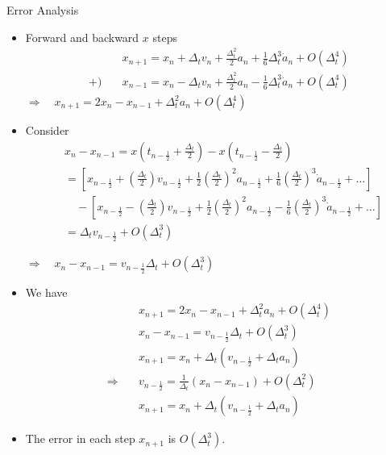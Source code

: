 \documentclass{beamer}
\newcommand{\beforeverb}{\footnotesize}
\newcommand{\afterverb}{\normalsize}
\begin{document}
\begin{frame}{Error Analysis}
  \begin{itemize}
    \item Forward and backward $x$ steps 
    \beforeverb
    \begin{align*} 
      & x_{n+1}=x_n+\Delta_t v_n+\frac{\Delta_t^2}{2} a_n+\frac{1}{6} 
      \Delta_t^3 \dot{a}_n+O\left(\Delta_t^4\right) \\ 
     +) \quad & x_{n-1}=x_n-\Delta_t v_n+\frac{\Delta_t^2}{2} a_n-\frac{1}{6} 
      \Delta_t^3 \dot{a}_n+O\left(\Delta_t^4\right)  
    \end{align*}
    \afterverb
    $\Rightarrow\quad   x_{n+1}=2 x_n-x_{n-1}+\Delta_t^2 a_n+O\left(\Delta_t^4\right)$
    \item Consider
    \beforeverb
    \begin{align*}
     & x_n-x_{n-1}=x\left(t_{n-\frac{1}{2}}+\frac{\Delta_t}{2}\right)-x\left(t_{n-\frac{1}{2}}-\frac{\Delta_t}{2}\right) \\
      &= \left[x_{n-\frac{1}{2}}+\left(\frac{\Delta_t}{2}\right) v_{n-\frac{1}{2}}+\frac{1}{2}\left(\frac{\Delta_t}{2}\right)^2 a_{n-\frac{1}{2}}+\frac{1}{6}\left(\frac{\Delta_t}{2}\right)^3 \dot{a}_{n-\frac{1}{2}}+\ldots\right]  \\
      & \quad-\left[x_{n-\frac{1}{2}}-\left(\frac{\Delta_t}{2}\right) v_{n-\frac{1}{2}}+\frac{1}{2}\left(\frac{\Delta_t}{2}\right)^2 a_{n-\frac{1}{2}}-\frac{1}{6}\left(\frac{\Delta_t}{2}\right)^3 \dot{a}_{n-\frac{1}{2}}+\ldots\right] \\
      &= \Delta_t v_{n-\frac{1}{2}}+O\left(\Delta_t^3\right) 
      \end{align*}
   \afterverb
   
   $ \Rightarrow \quad x_n-x_{n-1}=v_{n-\frac{1}{2}} \Delta_t+O\left(\Delta_t^3\right)$ 
    \end{itemize}
\end{frame}
\begin{frame}
  \begin{itemize}
    \item We have 
    \begin{align*}
      & x_{n+1}=2 x_n-x_{n-1}+\Delta_t^2 a_n+O\left(\Delta_t^4\right) \\
      & x_n-x_{n-1}=v_{n-\frac{1}{2}} \Delta_t+O\left(\Delta_t^3\right) \\
      & x_{n+1}=x_n+\Delta_t\left(v_{n-\frac{1}{2}}+\Delta_t a_n\right)\\
      \Rightarrow \quad & 
          v_{n-\frac{1}{2}}=\frac{1}{\Delta_t}\left(x_n-x_{n-1}\right)+O\left(\Delta_t^2\right) \\
          & x_{n+1}=x_n+\Delta_t\left(v_{n-\frac{1}{2}}+\Delta_t a_n\right)
    \end{align*}
    \item The error in each step $x_{n+1}$ is  $O(\Delta_t^3)$. 
  \end{itemize}
\end{frame}
\end{document}
